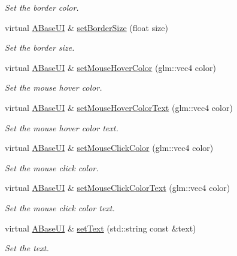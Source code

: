\begin{DoxyCompactItemize}
\begin{DoxyCompactList}\small\item\em Set the border color. \end{DoxyCompactList}\item 
virtual \hyperlink{class_a_base_u_i}{A\+Base\+UI} \& \hyperlink{class_a_base_u_i_a3028cb83474c9a384dac58d110aa196f}{set\+Border\+Size} (float size)
\begin{DoxyCompactList}\small\item\em Set the border size. \end{DoxyCompactList}\item 
virtual \hyperlink{class_a_base_u_i}{A\+Base\+UI} \& \hyperlink{class_a_base_u_i_a902c194cc52e03a49f52c74bdbe61deb}{set\+Mouse\+Hover\+Color} (glm\+::vec4 color)
\begin{DoxyCompactList}\small\item\em Set the mouse hover color. \end{DoxyCompactList}\item 
virtual \hyperlink{class_a_base_u_i}{A\+Base\+UI} \& \hyperlink{class_a_base_u_i_a27891d827140704a50a25f55c4939c03}{set\+Mouse\+Hover\+Color\+Text} (glm\+::vec4 color)
\begin{DoxyCompactList}\small\item\em Set the mouse hover color text. \end{DoxyCompactList}\item 
virtual \hyperlink{class_a_base_u_i}{A\+Base\+UI} \& \hyperlink{class_a_base_u_i_ab93705fee3e6dfdc900bea21a42695e0}{set\+Mouse\+Click\+Color} (glm\+::vec4 color)
\begin{DoxyCompactList}\small\item\em Set the mouse click color. \end{DoxyCompactList}\item 
virtual \hyperlink{class_a_base_u_i}{A\+Base\+UI} \& \hyperlink{class_a_base_u_i_a0afbe90ac3012028bd9895cdfe0d7861}{set\+Mouse\+Click\+Color\+Text} (glm\+::vec4 color)
\begin{DoxyCompactList}\small\item\em Set the mouse click color text. \end{DoxyCompactList}\item 
virtual \hyperlink{class_a_base_u_i}{A\+Base\+UI} \& \hyperlink{class_a_base_u_i_a82e182bfd577d37224aa49be3f64ac87}{set\+Text} (std\+::string const \&text)
\begin{DoxyCompactList}\small\item\em Set the text. \end{DoxyCompactList}\item 

\end{DoxyCompactItemize}
